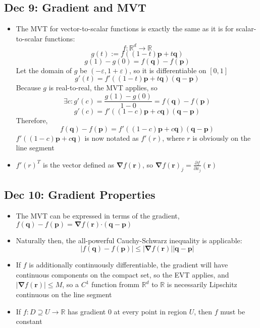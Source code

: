 \documentclass[10pt, oneside]{article}
\newcommand{\del}{\partial}
\let\leq\leqslant
\let\ep\varepsilon
\newcommand{\R}{\mathbb{R}}
\newcommand{\Cdot}{\boldsymbol{\cdot}}
\renewcommand{\vec}[1]{\mathbf{#1}}
\begin{document}
\subsection{Dec 9: Gradient and MVT}
\begin{itemize}
    \item The MVT for vector-to-scalar functions is exactly the same as it is for scalar-to-scalar functions:
        \[f : \R^d \rightarrow \R\]
        \[g(t) := f((1 - t)\vec{p} + t\vec{q})\]
        \[g(1) - g(0) = f(\vec{q}) - f(\vec{p})\]
    Let the domain of $g$ be $(-\ep, 1 + \ep)$, so it is differentiable on $[0,1]$
        \[g'(t) = f'((1  - t)\vec{p} + t\vec{q})(\vec{q} - \vec{p})\]
    Because $g$ is real-to-real, the MVT applies, so
        \[\exists c : g'(c) = \frac{g(1) - g(0)}{1-0} = f(\vec{q}) - f(\vec{p})\]
        \[g'(c) = f'((1 - c)\vec{p} + c\vec{q})(\vec{q} - \vec{p})\]
    Therefore, 
        \[f(\vec{q}) - f(\vec{p}) = f'((1 - c)\vec{p} + c\vec{q})(\vec{q} - \vec{p})\]
    $f'((1 - c)\vec{p} + c\vec{q})$ is now notated as $f'(r)$, where $r$ is obviously on the line segment
    \item $f'(r)^T$ is the vector defined as $\vec{\nabla}f(\vec{r})$, so $\vec{\nabla} f(\vec{r})_j = \frac{\del f}{\del x_j} (\vec{r})$ 
\end{itemize}

\subsection{Dec 10: Gradient Properties}
\begin{itemize}
    \item The MVT can be expressed in terms of the gradient, $f(\vec{q}) - f(\vec{p}) =  \vec{\nabla} f(\vec{r}) \Cdot (\vec{q} - \vec{p})$
    \item Naturally then, the all-powerful Cauchy-Schwarz inequality is applicable:
        \[|f(\vec{q}) - f(\vec{p})| \leq |\vec{\nabla} f(\vec{r})||\vec{q} - \vec{p}|\]
    \item If $f$ is additionally continuously differentiable, the gradient will have continuous components on the compact set, so the EVT applies, and $|\vec{\nabla} f(\vec{r})| \leq M$, so a $C^1$ function fromm $\R^d$ to $\R$ is necessarily Lipschitz continuous on the line segment
    \item If $f : D \supseteq U \rightarrow \R$ has gradient $0$ at every point in region $U$, then $f$ must be constant
\end{itemize}
\end{document}
